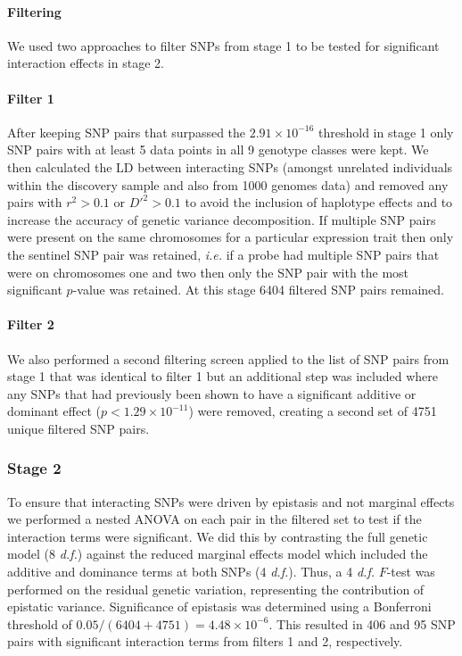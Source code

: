 \documentclass[paper=a4, fontsize=11pt]{scrartcl}         %
\numberwithin{equation}{section}                  %
\numberwithin{figure}{section}                    %
\numberwithin{table}{section}                   %
\begin{document}
\paragraph{Filtering} We used two approaches to filter SNPs from stage 1 to be tested for significant interaction effects in stage 2.

\paragraph{Filter 1} After keeping SNP pairs that surpassed the $2.91 \times 10^{-16}$ threshold in stage 1 only SNP pairs with at least 5 data points in all 9 genotype classes were kept. We then calculated the LD between interacting SNPs (amongst unrelated individuals within the discovery sample and also from 1000 genomes data) and removed any pairs with $r^2 > 0.1$ or $D'^{2} > 0.1$ to avoid the inclusion of haplotype effects and to increase the accuracy of genetic variance decomposition. If multiple SNP pairs were present on the same chromosomes for a particular expression trait then only the sentinel SNP pair was retained, \emph{i.e.} if a probe had multiple SNP pairs that were on chromosomes one and two then only the SNP pair with the most significant $p$-value was retained. At this stage 6404 filtered SNP pairs remained. 

\paragraph{Filter 2} We also performed a second filtering screen applied to the list of SNP pairs from stage 1 that was identical to filter 1 but an additional step was included where any SNPs that had previously been shown to have a significant additive or dominant effect ($p < 1.29 \times 10^{-11}$) were removed, creating a second set of 4751 unique filtered SNP pairs.

\subsubsection*{Stage 2}

To ensure that interacting SNPs were driven by epistasis and not marginal effects we performed a nested ANOVA on each pair in the filtered set to test if the interaction terms were significant. We did this by contrasting the full genetic model (8 \emph{d.f.}) against the reduced marginal effects model which included the additive and dominance terms at both SNPs (4 \emph{d.f.}). Thus, a 4 \emph{d.f.} $F$-test was performed on the residual genetic variation, representing the contribution of epistatic variance. Significance of epistasis was determined using a Bonferroni threshold of $0.05 / (6404+4751) = 4.48 \times 10^{-6}$. This resulted in 406 and 95 SNP pairs with significant interaction terms from filters 1 and 2, respectively.
\end{document}
